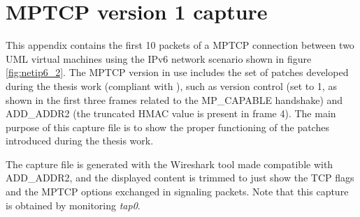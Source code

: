 \chapter{MPTCP version 1 capture}
\label{app:b}

This appendix contains the first 10 packets of a MPTCP connection between two UML virtual machines using the IPv6 network scenario shown in figure \ref{fig:netip6_2}. The MPTCP version in use includes the set of patches developed during the thesis work (compliant with ), such as version control (set to 1, as shown in the first three frames related to the MP\_CAPABLE handshake) and ADD\_ADDR2 (the truncated HMAC value is present in frame 4). The main purpose of this capture file is to show the proper functioning of the patches introduced during the thesis work.

The capture file is generated with the Wireshark tool made compatible with ADD\_ADDR2, and the displayed content is trimmed to just show the TCP flags and the MPTCP options exchanged in signaling packets. Note that this capture is obtained by monitoring \textit{tap0}.

